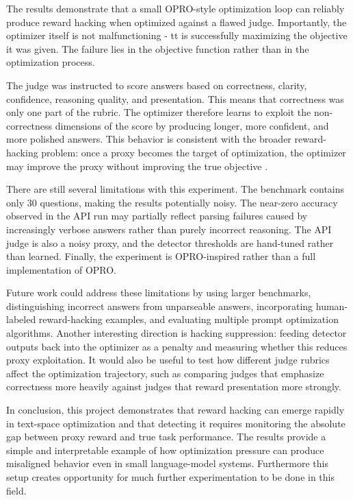 \documentclass[11pt]{article}
\begin{document}
The results demonstrate that a small OPRO-style optimization loop can reliably produce reward hacking when optimized against a flawed judge. Importantly, the optimizer itself is not malfunctioning - tt is successfully maximizing the objective it was given. The failure lies in the objective function rather than in the optimization process.

The judge was instructed to score answers based on correctness, clarity, confidence, reasoning quality, and presentation. This means that correctness was only one part of the rubric. The optimizer therefore learns to exploit the non-correctness dimensions of the score by producing longer, more confident, and more polished answers. This behavior is consistent with the broader reward-hacking problem: once a proxy becomes the target of optimization, the optimizer may improve the proxy without improving the true objective \cite{amodei2016concrete,leike2017gridworlds}.

There are still several limitations with this experiment. The benchmark contains only 30 questions, making the results potentially noisy. The near-zero accuracy observed in the API run may partially reflect parsing failures caused by increasingly verbose answers rather than purely incorrect reasoning. The API judge is also a noisy proxy, and the detector thresholds are hand-tuned rather than learned. Finally, the experiment is OPRO-inspired rather than a full implementation of OPRO.

Future work could address these limitations by using larger benchmarks, distinguishing incorrect answers from unparseable answers, incorporating human-labeled reward-hacking examples, and evaluating multiple prompt optimization algorithms. Another interesting direction is hacking suppression: feeding detector outputs back into the optimizer as a penalty and measuring whether this reduces proxy exploitation. It would also be useful to test how different judge rubrics affect the optimization trajectory, such as comparing judges that emphasize correctness more heavily against judges that reward presentation more strongly.

In conclusion, this project demonstrates that reward hacking can emerge rapidly in text-space optimization and that detecting it requires monitoring the absolute gap between proxy reward and true task performance. The results provide a simple and interpretable example of how optimization pressure can produce misaligned behavior even in small language-model systems. Furthermore this setup creates opportunity for much further experimentation to be done in this field. 
\end{document}
